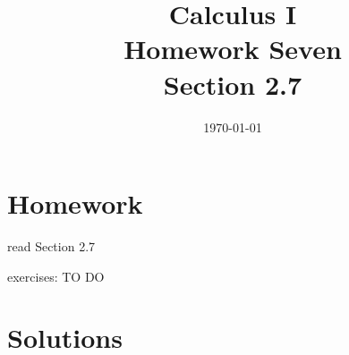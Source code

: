 \documentclass[letterpaper, landscape]{exam}
\title{Calculus I \\ Homework Seven \\ Section 2.7}
\author{}
\date{\today}
\begin{document}
  \maketitle

  \section{Homework}
    \begin{itemize*}
      \item read Section 2.7
      \item exercises: TO DO
    \end{itemize*}

  \ifprintanswers

  \section{Solutions}
\end{document}
